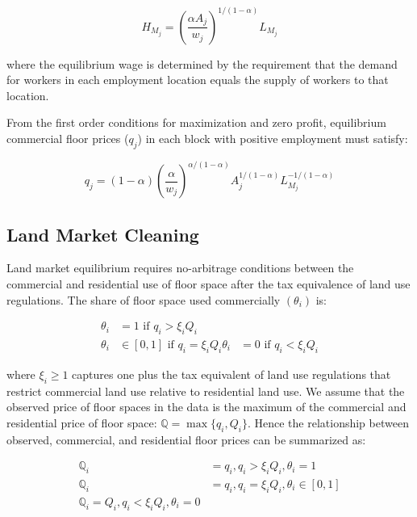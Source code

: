 \begin{equation}
  H_{M_j} = (\frac{\alpha A_j}{w_j})^{1/(1-\alpha)} L_{M_j}
\end{equation}

where the equilibrium wage is determined by the requirement that the demand for workers in each employment location equals the supply of workers to that location.

From the first order conditions for maximization and zero profit, equilibrium commercial floor prices ($q_j$) in each block with positive employment must satisfy:

\begin{equation}
  q_j = (1 - \alpha) (\frac{\alpha}{w_j})^{\alpha / (1 - \alpha)} A_j^{1/(1 - \alpha)} L_{M_j}^{-1/(1 - \alpha)}
\end{equation}

\subsection{Land Market Cleaning}

Land market equilibrium requires no-arbitrage conditions between the commercial and residential use of floor space after the tax equivalence of land use regulations. The share of floor space used commercially $(\theta_i)$ is:

\begin{equation}
  \begin{aligned}
    \theta_i & = 1 \text{ if } q_i > \xi_i Q_i \\
    \theta_i & \in [0, 1] \text{ if } q_i = \xi_i Q_i
    \theta_i & = 0 \text{ if } q_i < \xi_i Q_i
  \end{aligned}
\end{equation}

where $\xi_i \geq 1$ captures one plus the tax equivalent of land use regulations that restrict commercial land use relative to residential land use. We assume that the observed price of floor spaces in the data is the maximum of the commercial and residential price of floor space: $\mathbb{Q} = \max\{q_i, Q_i\}$. Hence the relationship between observed, commercial, and residential floor prices can be summarized as:

\begin{equation}
  \begin{aligned}
  \mathbb{Q}_i & = q_i, q_i > \xi_i Q_i, \theta_i = 1 \\
  \mathbb{Q}_i & = q_i, q_i = \xi_i Q_i, \theta_i \in [0, 1] \\
  \mathbb{Q}_i = Q_i, q_i < \xi_i Q_i, \theta_i = 0
\end{aligned}
\end{equation}


